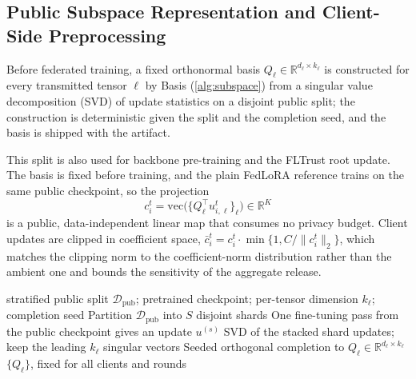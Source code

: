 \documentclass[a4paper,fleqn]{cas-dc}
\begin{document}
\subsection{Public Subspace Representation and Client-Side Preprocessing}
\label{subsec:publicsubspace}
\par
Before federated training, a fixed orthonormal basis $Q_\ell\in\mathbb{R}^{d_\ell\times k_\ell}$ is constructed for every transmitted tensor $\ell$ by Basis (\cref{alg:subspace}) from a singular value decomposition (SVD) of update statistics on a disjoint public split; the construction is deterministic given the split and the completion seed, and the basis is shipped with the artifact.
\par
This split is also used for backbone pre-training and the FLTrust root update. The basis is fixed before training, and the plain FedLoRA reference trains on the same public checkpoint, so the projection
\begin{equation}
c_i^t=\mathrm{vec}\big(\{Q_\ell^\top u_{i,\ell}^t\}_\ell\big)\in\mathbb{R}^{K}
\end{equation}
is a public, data-independent linear map that consumes no privacy budget. Client updates are clipped in coefficient space, $\bar c_i^t=c_i^t\cdot\min\{1,C/\|c_i^t\|_2\}$, which matches the clipping norm to the coefficient-norm distribution rather than the ambient one and bounds the sensitivity of the aggregate release.
\par
\begin{algorithm}[tbp]
\caption{Public-basis construction (Basis, offline)}
\label{alg:subspace}
\begin{algorithmic}[1]
\Require stratified public split $\mathcal{D}_{\mathrm{pub}}$; pretrained
checkpoint; per-tensor dimension $k_\ell$; completion seed
\State Partition $\mathcal{D}_{\mathrm{pub}}$ into $S$ disjoint shards
\State One fine-tuning pass from the public checkpoint gives an update $u^{(s)}$
\EndFor
{}
\State SVD of the stacked shard updates; keep the leading $k_\ell$ singular vectors
\State Seeded orthogonal completion to $Q_\ell\in\mathbb{R}^{d_\ell\times k_\ell}$
\EndFor
\State \Return $\{Q_\ell\}$, fixed for all clients and rounds
\end{algorithmic}
\end{algorithm}
\par
\end{document}
